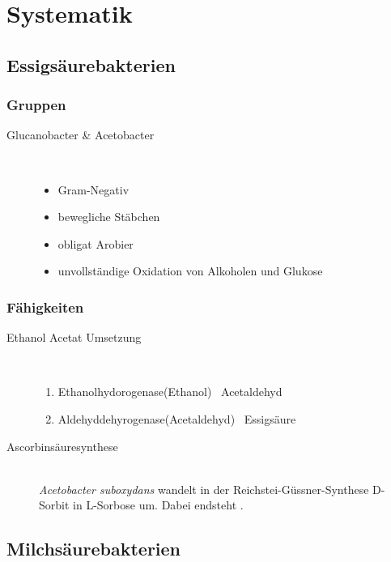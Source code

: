 \section{Systematik}

\subsection{Essigsäurebakterien}

\subsubsection*{Gruppen}
\begin{description}
	\item[Glucanobacter \& Acetobacter] \hfill \\
	\begin{itemize}
		\item Gram-Negativ
		\item bewegliche Stäbchen
		\item obligat Arobier
		\item unvollständige Oxidation von Alkoholen und Glukose
	\end{itemize}
\end{description}

\subsubsection*{Fähigkeiten}
\begin{description}
	\item[Ethanol \textrightarrow Acetat Umsetzung]\hfill\\
		\begin{enumerate}
			\item Ethanolhydorogenase(Ethanol) \textrightarrow \ Acetaldehyd
			\item Aldehyddehyrogenase(Acetaldehyd) \textrightarrow \ Essigsäure
		\end{enumerate}
	\item[Ascorbinsäuresynthese] \hfill \\
		\emph{Acetobacter suboxydans} wandelt in der Reichstei-Güssner-Synthese
		D-Sorbit in L-Sorbose um.
		Dabei endsteht .
		
\end{description}

\subsection{Milchsäurebakterien}

